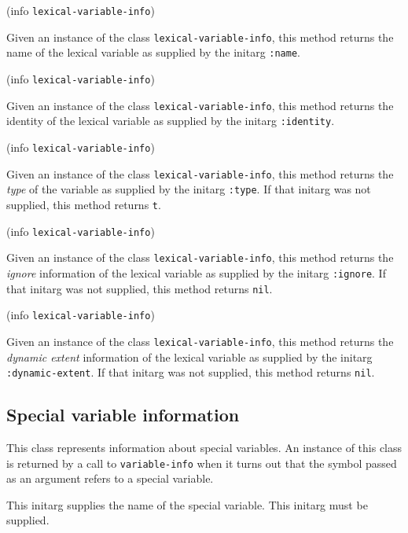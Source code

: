  {(info {\tt lexical-variable-info})}

Given an instance of the class \texttt{lexical-variable-info}, this
method returns the name of the lexical variable as supplied by the
initarg \texttt{:name}.

 {(info {\tt lexical-variable-info})}

Given an instance of the class \texttt{lexical-variable-info}, this
method returns the identity of the lexical variable as supplied by the
initarg \texttt{:identity}.

 {(info {\tt lexical-variable-info})}

Given an instance of the class \texttt{lexical-variable-info}, this
method returns the \emph{type} of the variable as supplied by the
initarg \texttt{:type}.  If that initarg was not supplied, this method
returns \texttt{t}.

 {(info {\tt lexical-variable-info})}

Given an instance of the class \texttt{lexical-variable-info}, this
method returns the \emph{ignore} information of the lexical variable as
supplied by the initarg \texttt{:ignore}.  If that initarg was not
supplied, this method returns \texttt{nil}.

 {(info {\tt lexical-variable-info})}

Given an instance of the class \texttt{lexical-variable-info}, this
method returns the \emph{dynamic extent} information of the lexical
variable as supplied by the initarg \texttt{:dynamic-extent}.  If that
initarg was not supplied, this method returns \texttt{nil}.

\subsection{Special variable information}


This class represents information about special variables.   An
instance of this class is returned by a call to \texttt{variable-info}
when it turns out that the symbol passed as an argument refers to a
special variable.



This initarg supplies the name of the special variable.  This initarg
must be supplied. 


